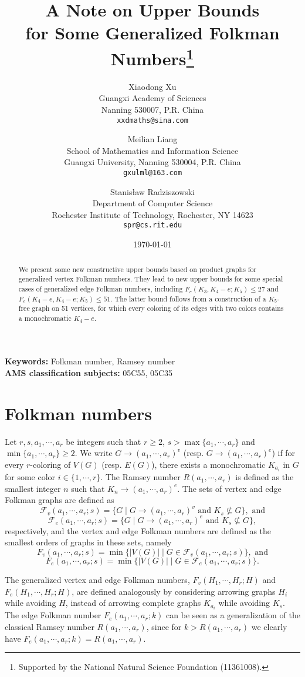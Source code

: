 \documentclass{article}[12pt]
\title{\bf
A Note on Upper Bounds\\
for Some Generalized Folkman Numbers\footnote{
Supported by the National Natural Science
Foundation (11361008).}}
\author{Xiaodong Xu\\[-0.1ex]
\small Guangxi Academy of Sciences\\[-0.6ex]
\small Nanning 530007, P.R. China\\[-0.6ex]
\small {\tt xxdmaths@sina.com}\\[1.3ex]\and
Meilian Liang\\[-0.1ex]
\small School of Mathematics and Information Science\\[-0.6ex]
\small Guangxi University, Nanning 530004, P.R. China\\[-0.6ex]
\small {\tt gxulml@163.com}\\[1.3ex]\and
Stanis{\l}aw Radziszowski\\[-0.1ex]
\small Department of Computer Science\\[-0.6ex]
\small Rochester Institute of Technology, Rochester, NY 14623\\[-0.6ex]
\small {\tt spr@cs.rit.edu}\\[3.3ex]
}
\date{\today}
\begin{document}
\maketitle
\thispagestyle{empty}
   
\begin{abstract}
We present some new constructive upper bounds
based on product graphs
for generalized vertex Folkman numbers. They
lead to new upper bounds for some
special cases of generalized edge Folkman numbers,
including $F_e(K_3,K_4-e; K_5) \leq 27$ and
$F_e(K_4-e,K_4-e; K_5) \leq 51$. The latter
bound follows from a construction of a
$K_5$-free graph on 51 vertices, for which
every coloring of its edges with two colors
contains a monochromatic $K_4-e$.
\end{abstract}

\bigskip
\noindent
{\bf Keywords:} Folkman number, Ramsey number\\
{\bf AMS classification subjects:} 05C55, 05C35

\section{Folkman numbers} \label{Folkman}

Let $r, s, a_1, \cdots, a_r$ be integers such
that $r \ge 2$,
$s >  \max \{a_1, \cdots, a_r \}$ and
$\min \{a_1, \cdots, a_r \} \ge 2$.
We write $G \rightarrow (a_1 ,\cdots ,a_r)^v$
(resp. $G \rightarrow (a_1 ,\cdots ,a_r)^e$)
if for every
$r$-coloring of $V(G)$ (resp. $E(G)$), there exists
a monochromatic $K_{a_i}$ in $G$ for some color
$i \in \{1, \cdots, r\}$.
The Ramsey number $R(a_1, \cdots, a_r)$
is defined as the smallest integer $n$ such that
$K_n \rightarrow (a_1, \cdots, a_r)^e$.
The sets of vertex and edge Folkman graphs are defined as
$$\mathcal{F}_v(a_1, \cdots, a_r; s)=\{G \;|\; G \rightarrow
(a_1, \cdots, a_r)^v \textrm{ and } K_s \not\subseteq G\},\textrm{ and}$$
$$\mathcal{F}_e(a_1, \cdots, a_r;s)=\{G\;|\; G \rightarrow
(a_1, \cdots, a_r)^e \textrm{ and } K_s \not\subseteq G\},$$
respectively, and the vertex and edge Folkman numbers
are defined as the smallest orders of graphs in these sets,
namely
$$F_v(a_1, \cdots, a_r;s)=\min\{|V(G)|\;|\;G\in
\mathcal{F}_v(a_1, \cdots, a_r;s) \},\textrm{ and}$$
$$F_e(a_1, \cdots, a_r;s)=\min\{|V(G)|\;|\;G\in
\mathcal{F}_e(a_1, \cdots, a_r;s) \}.$$

The generalized vertex and edge Folkman numbers,
$F_v(H_1, \cdots, H_r;H)$ and $F_e(H_1, \cdots, H_r;H)$,
are defined analogously by considering arrowing graphs
$H_i$ while avoiding $H$, instead of arrowing complete
graphs $K_{a_i}$ while avoiding $K_s$.
The edge Folkman number
$F_e(a_1, \cdots, a_r; k)$ can be seen as a generalization
of the classical Ramsey number $R(a_1, \cdots, a_r)$,
since for $k > R(a_1, \cdots, a_r)$ we clearly have
$F_e(a_1, \cdots, a_r; k) = R(a_1, \cdots, a_r).$
\end{document}
